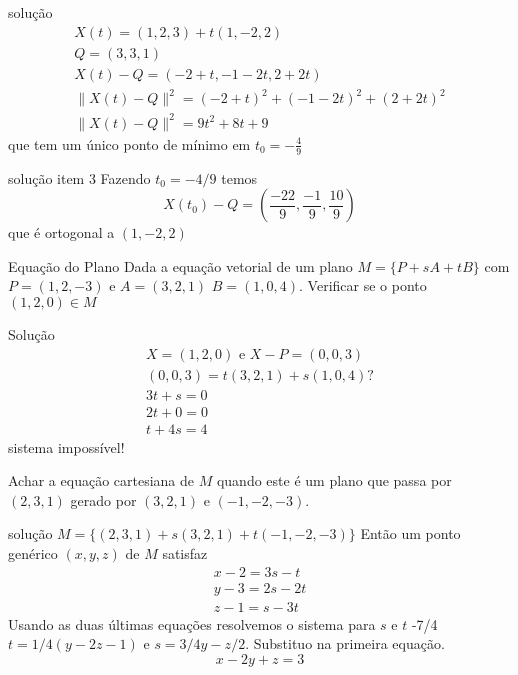 \documentclass{beamer}
\begin{document}
    \begin{frame}{solução}
     \begin{gather*}
       X(t) = (1,2,3)+t(1,-2,2) \\
       Q=(3,3,1)\\
       X(t)-Q =(-2+t,-1-2t,2+2t)\\
       \|X(t)-Q\|^2 = (-2+t)^2 + (-1-2t)^2+(2+2t)^2\\
       \|X(t)-Q\|^2 = 9t^2 + 8t +9
     \end{gather*} 
     que tem um único ponto de mínimo em $t_0=-\frac{4}{9}$
    \end{frame}
    \begin{frame}{solução item 3}
      Fazendo $t_0=-4/9$ temos
      $$X(t_0)-Q = (\frac{-22}{9}, \frac{-1}{9},\frac{10}{9})$$
      que é ortogonal a $(1,-2,2)$
    \end{frame}
   
    \begin{frame}{Equação do Plano}
      Dada a equação vetorial de um plano $M =\{P+sA+tB\}$
      com $P=(1,2,-3)$ e $A=(3,2,1)$ $B=(1,0,4)$.
      Verificar se o ponto $(1,2,0)\in M$
      
    \end{frame}
    \begin{frame}{Solução}
      \begin{gather*}
        X=(1,2,0) \text{ e }X-P=(0,0,3) \\
        (0,0,3)= t(3,2,1) + s(1,0,4) ? \\
        3t + s =0 \\
        2t + 0 =0 \\
        t + 4s =4
      \end{gather*}
      sistema impossível!

       \end{frame}
\begin{frame}
  Achar a equação cartesiana de $M$ quando este é um plano  
  que passa por $(2,3,1)$ gerado por $(3,2,1)$ e $(-1,-2,-3)$.

\end{frame}
\begin{frame}{solução} 
  $M=\{ (2,3,1)+s(3,2,1)+t(-1,-2,-3)\}$ Então um ponto genérico
   $(x,y,z)$ de $M$ satisfaz
  \begin{gather*}
    x-2 = 3s-t \\
    y-3 = 2s -2t \\
    z-1 = s-3t
  \end{gather*}
  Usando as duas últimas equações resolvemos o sistema 
  para $s$ e $t$ -7/4
  $t=1/4(y-2z-1)$ e $s=3/4y -z/2.$ Substituo na primeira equação.
  $$x-2y+z=3$$

\end{frame}
\end{document}
